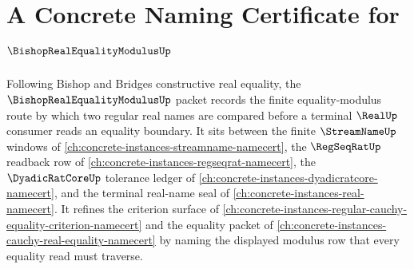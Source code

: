 \chapter{A Concrete Naming Certificate for $\BishopRealEqualityModulusUp$}
\label{ch:concrete-instances-bishop-real-equality-modulus-namecert}

Following Bishop and Bridges constructive real equality, the $\BishopRealEqualityModulusUp$ packet records the finite equality-modulus route by which two regular real names are compared before a terminal $\RealUp$ consumer reads an equality boundary. It sits between the finite $\StreamNameUp$ windows of \autoref{ch:concrete-instances-streamname-namecert}, the $\RegSeqRatUp$ readback row of \autoref{ch:concrete-instances-regseqrat-namecert}, the $\DyadicRatCoreUp$ tolerance ledger of \autoref{ch:concrete-instances-dyadicratcore-namecert}, and the terminal real-name seal of \autoref{ch:concrete-instances-real-namecert}. It refines the criterion surface of \autoref{ch:concrete-instances-regular-cauchy-equality-criterion-namecert} and the equality packet of \autoref{ch:concrete-instances-cauchy-real-equality-namecert} by naming the displayed modulus row that every equality read must traverse.

